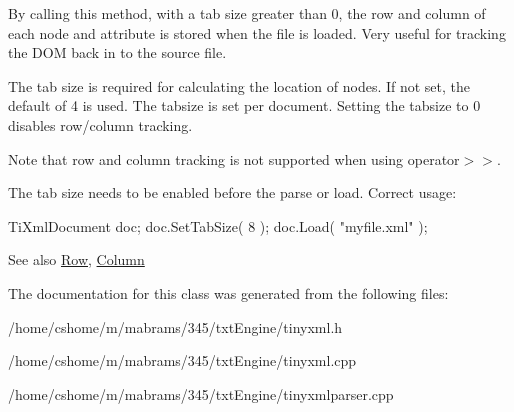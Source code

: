 By calling this method, with a tab size greater than 0, the row and column of each node and attribute is stored when the file is loaded. Very useful for tracking the DOM back in to the source file.

The tab size is required for calculating the location of nodes. If not set, the default of 4 is used. The tabsize is set per document. Setting the tabsize to 0 disables row/column tracking.

Note that row and column tracking is not supported when using operator$>$$>$.

The tab size needs to be enabled before the parse or load. Correct usage: \begin{DoxyVerb}
		TiXmlDocument doc;
		doc.SetTabSize( 8 );
		doc.Load( "myfile.xml" );
		\end{DoxyVerb}


\begin{DoxySeeAlso}{See also}
\hyperlink{class_ti_xml_base_a024bceb070188df92c2a8d8852dd0853}{Row}, \hyperlink{class_ti_xml_base_ab54bfb9b70fe6dd276e7b279cab7f003}{Column} 
\end{DoxySeeAlso}


The documentation for this class was generated from the following files:\begin{DoxyCompactItemize}
\item 
/home/cshome/m/mabrams/345/txtEngine/tinyxml.h\item 
/home/cshome/m/mabrams/345/txtEngine/tinyxml.cpp\item 
/home/cshome/m/mabrams/345/txtEngine/tinyxmlparser.cpp\end{DoxyCompactItemize}
